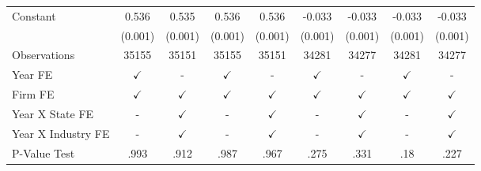 {\begin{tabular}{l*{8}{c}}
Constant            &       0.536\sym{***}&       0.535\sym{***}&       0.536\sym{***}&       0.536\sym{***}&      -0.033\sym{***}&      -0.033\sym{***}&      -0.033\sym{***}&      -0.033\sym{***}\\
                    &     (0.001)         &     (0.001)         &     (0.001)         &     (0.001)         &     (0.001)         &     (0.001)         &     (0.001)         &     (0.001)         \\
\midrule
Observations        &       35155         &       35151         &       35155         &       35151         &       34281         &       34277         &       34281         &       34277         \\
Year FE             &$\checkmark$         &           -         &$\checkmark$         &           -         &$\checkmark$         &           -         &$\checkmark$         &           -         \\
Firm FE             &$\checkmark$         &$\checkmark$         &$\checkmark$         &$\checkmark$         &$\checkmark$         &$\checkmark$         &$\checkmark$         &$\checkmark$         \\
Year X State FE     &           -         &$\checkmark$         &           -         &$\checkmark$         &           -         &$\checkmark$         &           -         &$\checkmark$         \\
Year X Industry FE  &           -         &$\checkmark$         &           -         &$\checkmark$         &           -         &$\checkmark$         &           -         &$\checkmark$         \\
P-Value Test        &        .993         &        .912         &        .987         &        .967         &        .275         &        .331         &         .18         &        .227         \\
\bottomrule
\end{tabular}
}
